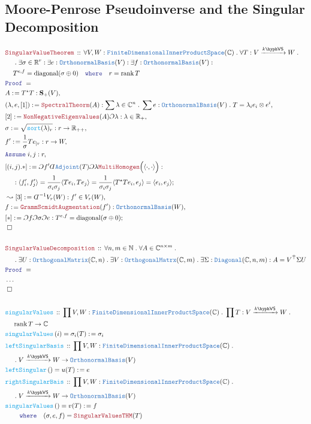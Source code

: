 \documentclass[12pt]{scrartcl}%
\newcommand{\TYPE}[1]{\textcolor{NavyBlue}{\mathtt{#1}}}%
\newcommand{\FUNC}[1]{\textcolor{Cerulean}{\mathtt{#1}}}%
\newcommand{\LOGIC}[1]{\textcolor{Blue}{\mathtt{#1}}}%
\newcommand{\THM}[1]{\textcolor{Maroon}{\mathtt{#1}}}%
\renewcommand{\.}{\; . \;} %
\newcommand{\de}{: \kern 0.1pc =} %
\newcommand{\where}{\LOGIC{where}} %
\newcommand{\Act}[1]{\left( #1 \right)} %
\newcommand{\Theorem}[2]{& \THM{#1} \, :: \, #2 \\ & \Proof = \\ } %
\newcommand{\DeclareFunc}[2]{& \FUNC{#1} \, :: \, #2 \\}%
\newcommand{\DefineNamedFunc}[4]{&  \FUNC{#1}\Act{#2} = #3 \de #4 \\}%
\newcommand{\NewLine}{\\ & \kern 1pc}%
\newcommand{\Page}[1]{ \begin{align*} #1 \end{align*}  }%
\newcommand{ \bd }{ \ByDef }%
\newcommand{\NoProof}{ & \ldots \\ \EndProof}%
\newcommand{\Reals}{\mathbb{R}}%
\newcommand{\Complex}{\mathbb{C}}%
\newcommand{\Nat}{\mathbb{N}}%
\newcommand{\Say}[3]{& #1 \de #2 : #3, \\} %
\newcommand{\Conclude}[3]{& #1 \de #2 : #3; \\}%
\newcommand{\Derive}[3]{& \leadsto #1 \de #2 : #3, \\} %
\newcommand{\Assume}[2]{& \LOGIC{Assume} \; #1 : #2, \\} %
\newcommand{\QED}{\; \square} %
\newcommand{\EndProof}{& \QED \\} %
\newcommand{\ByDef}{\rotatebox[origin=c]{-180}{$D$}}%
\newcommand{\ByConstr}{\rotatebox[origin=c]{-180}{$C$}}%
\newcommand{\Proof}{\LOGIC{Proof} \; } %
\newcommand{\Arrow}[1]{\xrightarrow{#1}}%
\DeclareMathOperator{\rank}{rank} %
\newcommand{\OBasis}{\TYPE{OrthonormalBasis}}
\newcommand{\FDIPS}{\TYPE{FiniteDimensionalInnerProductSpace}}
\newcommand{\VS}[1]{#1\hyph\mathsf{VS}} %
\renewcommand{\S}{\mathbf{S}}
\begin{document}
\subsection{Moore-Penrose Pseudoinverse and the Singular Decomposition}
\Page{
	\Theorem{SingularValueTheorem}
	{
		\forall V,W : \FDIPS(\Complex) \. \forall T : V \Arrow{\VS{k}} W \. \NewLine
		\. \exists \sigma \in \Reals^r : 
		\exists e : \OBasis(V) :
		\exists f : \OBasis(V) : \NewLine
		T^{e,f} = \mathrm{diagonal}(\sigma \oplus 0) 
		\quad \where \quad
		r = \rank T
	}
	\Say{A}{T^\star T}{\S_+(V)}
	\Say{(\lambda,e,[1])}{ \THM{SpectralTheorm}(A) }{  \sum \lambda \in \Complex^n \. \sum e : \OBasis(V) \. T = \lambda_i  e_i \otimes e^i }
	\Say{[2]}{\THM{NonNegativeEigenvalues}(A)\ByConstr \lambda}{ \lambda \in \Reals_+}
	\Say{\sigma}{\sqrt{\FUNC{sort}(\lambda)_r}}{r \to \Reals_{++}}
	\Say{f'}{ \frac{1}{\sigma}Te_{|r}}{r \to W}
	\Assume{i,j}{r}
	\Conclude{[(i,j).*]}{\ByConstr f' \bd \TYPE{Adjoint}(T) \ByConstr \lambda \THM{MultiHomogen}\Big(\langle \cdot,\cdot \rangle\Big)  }{ 
		\NewLine :
		\langle f_i', f_j' \rangle = 
		\frac{1}{\sigma_i\sigma_j}\langle Te_i, Te_j \rangle = 
		\frac{1}{\sigma_i \sigma_j} \langle T^\star Te_i, e_j \rangle = 
		\langle e_i,e_j \rangle
	}
	\Derive{[3]}{\bd^{-1}V_r(W)}{ f' \in V_r(W)}
	\Say{f}{\THM{GrammScmidtAugmentation}(f')}{\OBasis(W)}
	\Conclude{[*]}{\ByConstr f \ByConstr \sigma \ByConstr e}{T^{e,f} = \mathrm{diagonal}(\sigma \oplus 0)} 
	\EndProof
	\\
	\Theorem{SingularValueDecomposition}{
			\forall n,m \in \Nat \. 
			\forall A \in \Complex^{n \times m} \. \NewLine \.  
			\exists U : \TYPE{OrthogonalMatrix}(\Complex,n) \.
			\exists V : \TYPE{OrthogonalMatrx}(\Complex,m) \.
			\exists \Sigma : \TYPE{Diagonal}(\Complex,n,m) : 
			A = V^{\bar \top} \Sigma U
		}
	\NoProof
	\\
	\DeclareFunc{singularValues}{ \prod V,W : \FDIPS(\Complex) \. \prod T : V \Arrow{\VS{k}} W \. \NewLine \rank T \to \Complex }
	\DefineNamedFunc{singularValues}{i}{\sigma_i(T)}{\sigma_i}
	\DeclareFunc{leftSingularBasis}{ \prod V,W : \FDIPS(\Complex) \. \NewLine \.  V \Arrow{\VS{k}} W \to \OBasis(V) }
	\DefineNamedFunc{leftSingular}{ }{u(T)}{e}
	\DeclareFunc{rightSingularBais}{ \prod V,W : \FDIPS(\Complex) \.  \NewLine \. V \Arrow{\VS{k}} W \to \OBasis(V) }
	\DefineNamedFunc{singularValues}{ }{v(T)}{f \NewLine \quad \where \quad (\sigma,e,f) = \THM{SingularValuesTHM}(T)}
}
\end{document}
